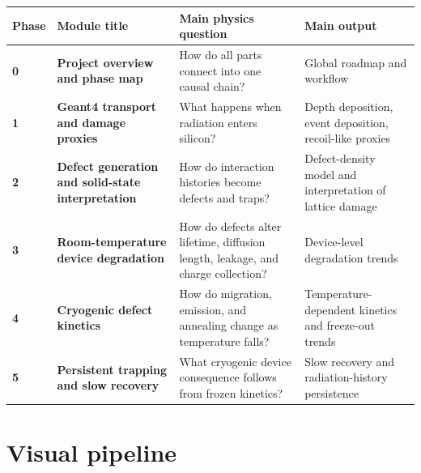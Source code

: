 \documentclass[11pt]{article}
\begin{document}
\begin{center}
\begin{tabularx}{\textwidth}{>{\bfseries}p{} >{\bfseries}p{} Y Y}
\toprule
Phase & Module title & Main physics question & Main output \\
 & Project overview and phase map & How do all parts connect into one causal chain? & Global roadmap and workflow \\
1 & Geant4 transport and damage proxies & What happens when radiation enters silicon? & Depth deposition, event deposition, recoil-like proxies \\
2 & Defect generation and solid-state interpretation & How do interaction histories become defects and traps? & Defect-density model and interpretation of lattice damage \\
3 & Room-temperature device degradation & How do defects alter lifetime, diffusion length, leakage, and charge collection? & Device-level degradation trends \\
4 & Cryogenic defect kinetics & How do migration, emission, and annealing change as temperature falls? & Temperature-dependent kinetics and freeze-out trends \\
5 & Persistent trapping and slow recovery & What cryogenic device consequence follows from frozen kinetics? & Slow recovery and radiation-history persistence \\
\bottomrule
\end{tabularx}
\end{center}

\section{Visual pipeline}
\begin{center}
\end{center}
\end{document}

